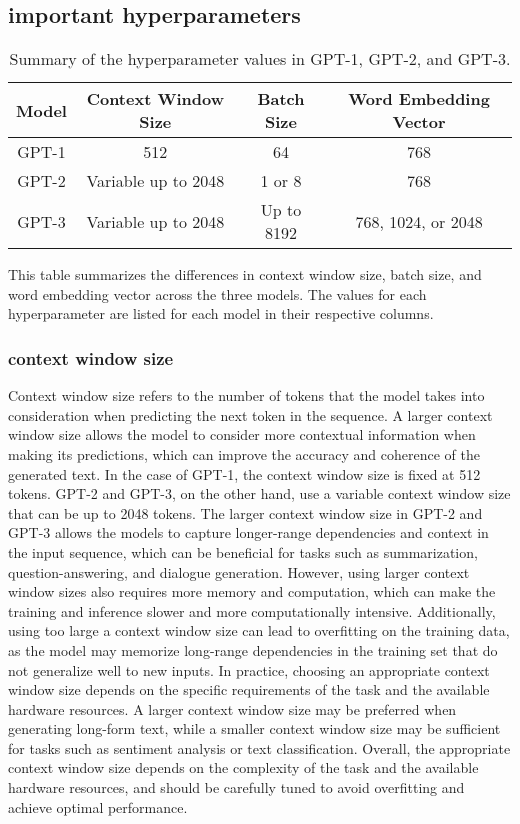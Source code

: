 \documentclass[
	11pt,
	a4paper,
	figtabcapt,
]{oblivoir}
\begin{document}
\subsection{important hyperparameters}
\begin{table}[h]
	\centering
	\begin{tabular}{|c|c|c|c|}
	\hline
	Model & Context Window Size & Batch Size & Word Embedding Vector \\
	\hline
	GPT-1 & 512 & 64 & 768 \\
	\hline
	GPT-2 & Variable up to 2048 & 1 or 8 & 768 \\
	\hline
	GPT-3 & Variable up to 2048 & Up to 8192 & 768, 1024, or 2048 \\
	\hline
	\end{tabular}
	\caption{Summary of the hyperparameter values in GPT-1, GPT-2, and GPT-3.}
\end{table}
	
This table summarizes the differences in context window size, batch size, and word embedding vector across the three models. The values for each hyperparameter are listed for each model in their respective columns.

\subsubsection{context window size}
Context window size refers to the number of tokens that the model takes into consideration when predicting the next token in the sequence. A larger context window size allows the model to consider more contextual information when making its predictions, which can improve the accuracy and coherence of the generated text.
In the case of GPT-1, the context window size is fixed at 512 tokens. GPT-2 and GPT-3, on the other hand, use a variable context window size that can be up to 2048 tokens. The larger context window size in GPT-2 and GPT-3 allows the models to capture longer-range dependencies and context in the input sequence, which can be beneficial for tasks such as summarization, question-answering, and dialogue generation.
However, using larger context window sizes also requires more memory and computation, which can make the training and inference slower and more computationally intensive. Additionally, using too large a context window size can lead to overfitting on the training data, as the model may memorize long-range dependencies in the training set that do not generalize well to new inputs.
In practice, choosing an appropriate context window size depends on the specific requirements of the task and the available hardware resources. A larger context window size may be preferred when generating long-form text, while a smaller context window size may be sufficient for tasks such as sentiment analysis or text classification.
Overall, the appropriate context window size depends on the complexity of the task and the available hardware resources, and should be carefully tuned to avoid overfitting and achieve optimal performance.
\end{document}
